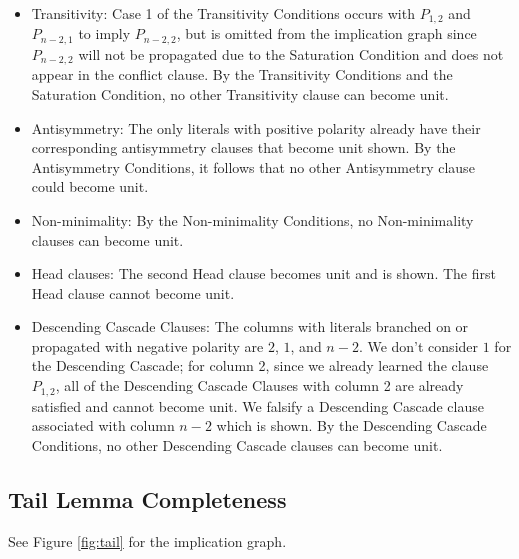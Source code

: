 \documentclass[10pt,a4paper]{article}
\begin{document}
\begin{itemize}
    \item Transitivity: Case 1 of the Transitivity Conditions occurs with $P_{1, 2}$ and $P_{n - 2, 1}$ to imply $P_{n - 2, 2}$, but is omitted from the implication graph since $P_{n - 2, 2}$ will not be propagated due to the Saturation Condition and does not appear in the conflict clause. By the Transitivity Conditions and the Saturation Condition, no other Transitivity clause can become unit. 
    \item Antisymmetry: The only literals with positive polarity already have their corresponding antisymmetry clauses that become unit shown. By the Antisymmetry Conditions, it follows that no other Antisymmetry clause could become unit. 
    \item Non-minimality: By the Non-minimality Conditions, no Non-minimality clauses can become unit. 
    \item Head clauses: The second Head clause becomes unit and is shown. The first Head clause cannot become unit. 
    \item Descending Cascade Clauses: The columns with literals branched on or propagated with negative polarity are $2$, $1$, and $n - 2$. We don't consider $1$ for the Descending Cascade; for column 2, since we already learned the clause $P_{1, 2}$, all of the Descending Cascade Clauses with column 2 are already satisfied and cannot become unit. We falsify a Descending Cascade clause associated with column $n - 2$ which is shown. By the Descending Cascade Conditions, no other Descending Cascade clauses can become unit. 
\end{itemize}

\subsection{Tail Lemma Completeness}
See Figure \ref{fig:tail} for the implication graph.
\end{document}
